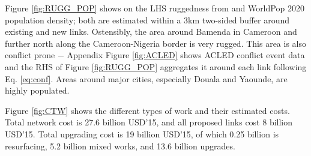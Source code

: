 \documentclass[a4paper]{article}
\begin{document}
Figure \ref{fig:RUGG_POP} shows on the LHS ruggedness from \citet{nunn2012ruggedness} and WorldPop 2020 population density; both are estimated within a 3km two-sided buffer around existing and new links. Ostensibly, the area around Bamenda in Cameroon and further north along the Cameroon-Nigeria border is very rugged. This area is also conflict prone $-$ Appendix Figure \ref{fig:ACLED} shows ACLED conflict event data \citep{raleigh2023political} and the RHS of Figure \ref{fig:RUGG_POP} aggregates it around each link following Eq. \ref{eq:conf}. %
Areas around major cities, especially Douala and Yaounde, are highly populated. \newline

Figure \ref{fig:CTW} shows the different types of work and their estimated costs. Total network cost is 27.6 billion USD'15, and all proposed links cost 8 billion USD'15. Total upgrading cost is 19 billion USD'15, of which 0.25 billion is resurfacing, 5.2 billion mixed works, and 13.6 billion upgrades. 
\end{document}
